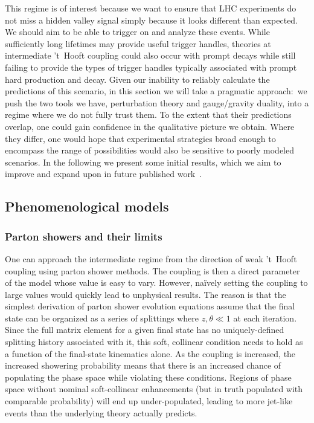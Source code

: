 This regime is of interest because we want to ensure that LHC experiments do not miss a hidden valley signal simply because it looks different than expected. We should aim to be able to trigger on and analyze these events. While sufficiently long lifetimes may provide useful trigger handles, theories at intermediate 't~Hooft coupling could also occur with prompt decays while still failing to provide the types of trigger handles typically associated with prompt hard production and decay. Given our inability to reliably calculate the predictions of this scenario, in this section we will take a pragmatic approach:~we push the two tools we have, perturbation theory and gauge/gravity duality, into a regime where we do not fully trust them. To the extent that their predictions overlap, one could gain confidence in the qualitative picture we obtain. Where they differ, one would hope that experimental strategies broad enough to encompass the range of possibilities would also be sensitive to poorly modeled scenarios. In the following we present some initial results, which we aim to improve and expand upon in future published work~\cite{showersinprogress}.

\subsection{Phenomenological models}

\subsubsection{Parton showers and their limits}

One can approach the intermediate regime from the direction of weak 't~Hooft coupling using parton shower methods. The coupling is then a direct parameter of the model whose value is easy to vary. However, na\"ively setting the coupling to large values would quickly lead to unphysical results. The reason is that the simplest derivation of parton shower evolution equations assume that the final state can be organized as a series of splittings where $z, \theta \ll 1$ at each iteration. Since the full matrix element for a given final state has no uniquely-defined splitting history associated with it, this soft, collinear condition needs to hold as a function of the final-state kinematics alone. As the coupling is increased, the increased showering probability means that there is an increased chance of populating the phase space while violating these conditions. Regions of phase space without nominal soft-collinear enhancements (but in truth populated with comparable probability) will end up under-populated, leading to more jet-like events than the underlying theory actually predicts.

